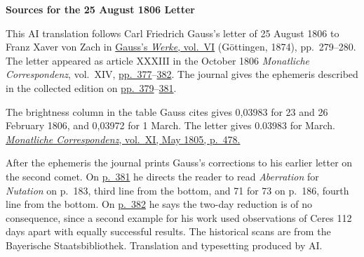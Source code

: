 \clearpage\thispagestyle{empty}
\begin{center}\textbf{Sources for the 25 August 1806 Letter}\end{center}
\noindent This AI translation follows Carl Friedrich Gauss’s letter of 25 August 1806 to Franz Xaver von Zach in \href{https://gdz.sub.uni-goettingen.de/id/PPN236007467}{Gauss’s \textit{Werke}, vol.~VI} (Göttingen, 1874), pp.~279--280. The letter appeared as article XXXIII in the October 1806 \textit{Monatliche Correspondenz}, vol.~XIV, \href{https://www.digitale-sammlungen.de/en/view/bsb10538606?page=393}{pp.~377}--\href{https://www.digitale-sammlungen.de/en/view/bsb10538606?page=398}{382}. The journal gives the ephemeris described in the collected edition on \href{https://www.digitale-sammlungen.de/en/view/bsb10538606?page=395}{pp.~379}--\href{https://www.digitale-sammlungen.de/en/view/bsb10538606?page=397}{381}.
\par\medskip
The brightness column in the table Gauss cites gives 0,03983 for 23 and 26 February 1806, and 0,03972 for 1 March. The letter gives 0.03983 for March. \href{https://www.digitale-sammlungen.de/en/view/bsb10538603?page=492}{\textit{Monatliche Correspondenz}, vol.~XI, May 1805, p.~478.}
\par\medskip
After the ephemeris the journal prints Gauss’s corrections to his earlier letter on the second comet. On \href{https://www.digitale-sammlungen.de/en/view/bsb10538606?page=397}{p.~381} he directs the reader to read \emph{Aberration} for \emph{Nutation} on p.~183, third line from the bottom, and 71 for 73 on p.~186, fourth line from the bottom. On \href{https://www.digitale-sammlungen.de/en/view/bsb10538606?page=398}{p.~382} he says the two-day reduction is of no consequence, since a second example for his work used observations of Ceres 112 days apart with equally successful results. The historical scans are from the Bayerische Staatsbibliothek. Translation and typesetting produced by AI.
\clearpage
